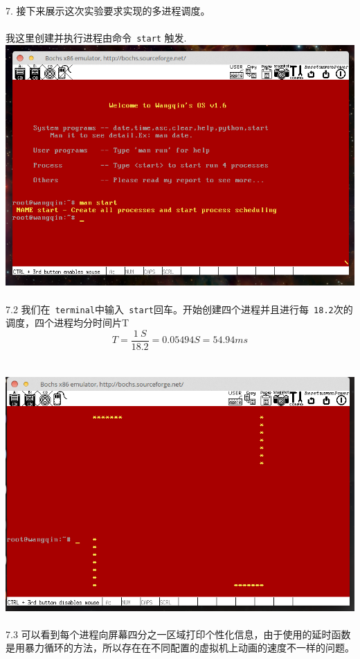 \documentclass[a4paper]{article}
\begin{document}
{{7. 接下来展示这次实验要求实现的多进程调度。\\\\
 我这里创建并执行进程由命令\verb| start|  触发.
{\center\includegraphics[scale=0.45]{Illustrations/man_start.png}}\\\\
7.2 我们在\verb| terminal|中输入\verb| start|回车。开始创建四个进程并且进行每\verb| 18.2|次的调度，四个进程均分时间片T\\
\[ T = \frac{1 \ S}{18.2} = 0.05494 S = 54.94 ms \]\\\\
{\center\includegraphics[scale=0.45]{Illustrations/process_start.png}}\\\\
7.3 可以看到每个进程向屏幕四分之一区域打印个性化信息，由于使用的延时函数是用暴力循环的方法，所以存在在不同配置的虚拟机上动画的速度不一样的问题。
}}
\end{document}
